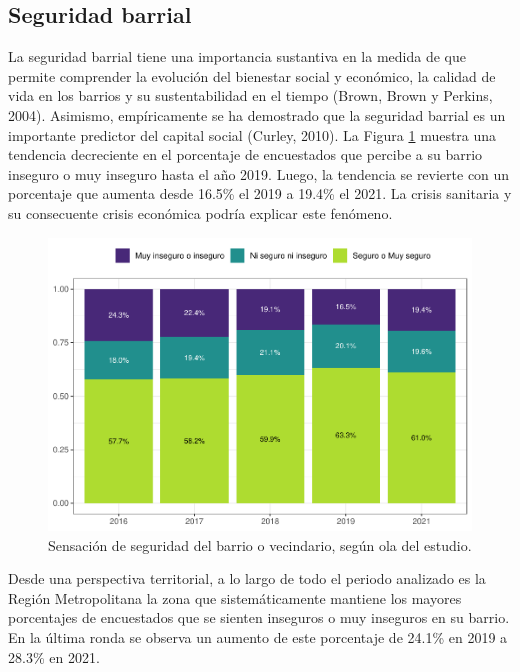 \documentclass[
  12pt,
]{book}
\begin{document}
\hypertarget{seguridad-barrial}{%
\subsection*{Seguridad barrial}\label{seguridad-barrial}}

La seguridad barrial tiene una importancia sustantiva en la medida de que permite comprender la evolución del bienestar social y económico, la calidad de vida en los barrios y su sustentabilidad en el tiempo (Brown, Brown y Perkins, 2004). Asimismo, empíricamente se ha demostrado que la seguridad barrial es un importante predictor del capital social (Curley, 2010).
La Figura \ref{fig:seguri-ola} muestra una tendencia decreciente en el porcentaje de encuestados que percibe a su barrio inseguro o muy inseguro hasta el año 2019. Luego, la tendencia se revierte con un porcentaje que aumenta desde 16.5\% el 2019 a 19.4\% el 2021. La crisis sanitaria y su consecuente crisis económica podría explicar este fenómeno.

\begin{figure}

{\centering \includegraphics{reporte-elsoc_files/figure-latex/seguri-ola-1} 

}

\caption{Sensación de seguridad del barrio o vecindario, según ola del estudio.}\label{fig:seguri-ola}
\end{figure}

Desde una perspectiva territorial, a lo largo de todo el periodo analizado es la Región Metropolitana la zona que sistemáticamente mantiene los mayores porcentajes de encuestados que se sienten inseguros o muy inseguros en su barrio. En la última ronda se observa un aumento de este porcentaje de 24.1\% en 2019 a 28.3\% en 2021.
\end{document}
